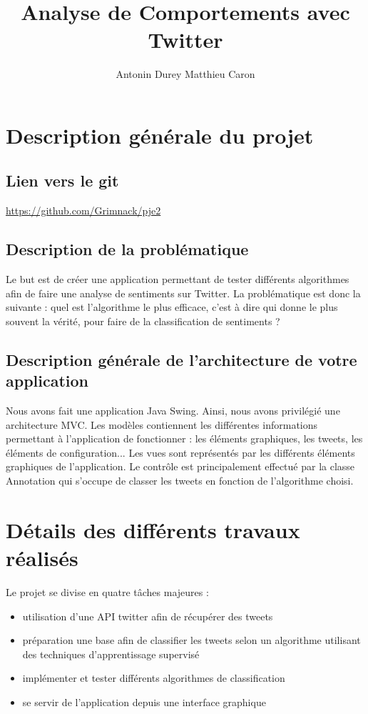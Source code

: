 \documentclass[a4paper,10pt]{report}
\title{Analyse de Comportements avec Twitter}
\author{Antonin Durey Matthieu Caron}
\begin{document}
\maketitle
\clearpage
{}
\chapter{Description générale du projet}
  \section{Lien vers le git}
    \url{https://github.com/Grimnack/pje2}
  \section{Description de la problématique}
    Le but est de créer une application permettant de tester différents algorithmes
    afin de faire une analyse de sentiments sur Twitter. La problématique est donc la suivante :
    quel est l'algorithme le plus efficace, c'est à dire qui donne le plus souvent la vérité, pour faire de la 
    classification de sentiments ?
  \section{Description générale de l'architecture de votre application}
    Nous avons fait une application Java Swing. Ainsi, nous avons privilégié une architecture MVC.
    Les modèles contiennent les différentes informations permettant à l'application de fonctionner : les éléments graphiques, les tweets, les éléments de configuration...
    Les vues sont représentés par les différents éléments graphiques de l'application.
    Le contrôle est principalement effectué par la classe Annotation qui s'occupe de classer les tweets en fonction de l'algorithme choisi. 
\chapter{Détails des différents travaux réalisés}
  Le projet se divise en quatre tâches majeures : 
  \begin{itemize}
   \item utilisation d'une API twitter afin de récupérer des tweets
   \item préparation une base afin de classifier les tweets selon un algorithme utilisant des techniques d'apprentissage supervisé
   \item implémenter et tester différents algorithmes de classification
   \item se servir de l'application depuis une interface graphique
  \end{itemize}
\end{document}
